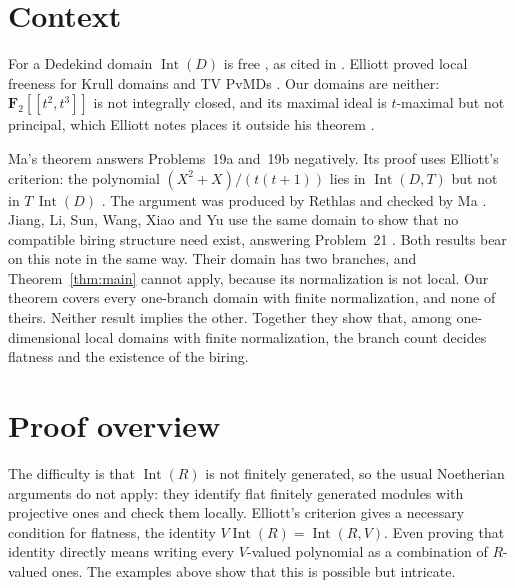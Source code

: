 \documentclass[11pt,a4paper]{article}
\theoremstyle{plain}
\theoremstyle{remark}
\newcommand{\F}{\mathbf F}
\newcommand{\Int}{\operatorname{Int}}
\begin{document}
\section{Context}

For a Dedekind domain $\Int(D)$ is free \cite[Remark~II.3.7(iii)]{CC}, as cited in \cite[p.~2]{E11b}.
Elliott proved local freeness for Krull domains and TV PvMDs \cite[Theorem~1.2]{E11a}. Our domains are neither:
$\F_2[[t^2,t^3]]$ is not integrally closed, and its maximal ideal is $t$-maximal but not principal, which Elliott
notes places it outside his theorem \cite[p.~4]{E11a}.

Ma's theorem \cite[Theorem~1.1]{Ma} answers Problems~19a and~19b negatively. Its proof uses Elliott's criterion: the
polynomial $(X^2+X)/(t(t+1))$ lies in $\Int(D,T)$ but not in $T\,\Int(D)$ \cite[Proposition~4.1, pp.~4--5]{Ma}. The
argument was produced by Rethlas and checked by Ma \cite[\S6]{Ma}. Jiang, Li, Sun, Wang, Xiao and Yu use the same
domain to show that no compatible biring structure need exist, answering Problem~21 \cite[Theorem~3.4]{JLSWXY}. Both
results bear on this note in the same way. Their domain has two branches, and Theorem~\ref{thm:main} cannot apply,
because its normalization is not local. Our theorem covers every one-branch domain with finite normalization, and
none of theirs. Neither result implies the other. Together they show that, among one-dimensional local domains with
finite normalization, the branch count decides flatness and the existence of the biring.

\section{Proof overview}

The difficulty is that $\Int(R)$ is not finitely generated, so the usual Noetherian arguments do not apply: they
identify flat finitely generated modules with projective ones and check them locally. Elliott's criterion gives a
necessary condition for flatness, the identity $V\Int(R)=\Int(R,V)$. Even proving that identity directly means
writing every $V$-valued polynomial as a combination of $R$-valued ones. The examples above show that this is possible but
intricate.
\end{document}
